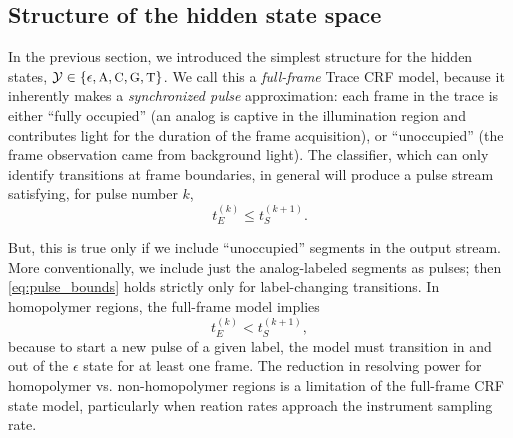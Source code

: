 \documentclass[10pt]{article}
\newcommand{\crf}{{\small CRF}}
\newcommand{\tcrf}{Trace {\small CRF}}
\newcommand{\fA}{\ensuremath{\text{\small{A}}}}
\newcommand{\fC}{\ensuremath{\text{\small{C}}}}
\newcommand{\fG}{\ensuremath{\text{\small{G}}}}
\newcommand{\fT}{\ensuremath{\text{\small{T}}}}
\begin{document}
\subsection{Structure of the hidden state space}
\label{sec:state_space}
In the previous section, we introduced the simplest structure for the hidden states,
$\mathcal{Y} \in \{\epsilon, \fA, \fC, \fG, \fT\}$. 
We call this a \emph{full-frame} \tcrf{} model, because it inherently makes a \emph{synchronized pulse} approximation: each frame in the trace is either ``fully occupied'' (an  analog is captive in the illumination region and contributes light for the duration of the frame acquisition), or ``unoccupied'' (the frame observation came from background light). 
The classifier, which can only identify transitions at frame boundaries, in general will produce a pulse stream satisfying, for pulse number $k$,
\begin{equation}
t_E^{(k)} \le t_S^{(k+1)}. \label{eq:pulse_bounds}
\end{equation}

But, this is true only if we include ``unoccupied'' segments in the output stream.
More conventionally, we include just the analog-labeled segments as pulses; then \eqref{eq:pulse_bounds} holds strictly only for label-changing transitions.  In homopolymer regions, the full-frame model implies
\begin{equation}
t_E^{(k)} < t_S^{(k+1)},
\end{equation}
because to start a new pulse of a given label, the model must transition in and out of the $\epsilon$ state for at least one frame.
The reduction in resolving power for homopolymer vs. non-homopolymer regions is a limitation of the full-frame \crf{} state model,
particularly when reation rates approach the instrument sampling rate.

\end{document}
